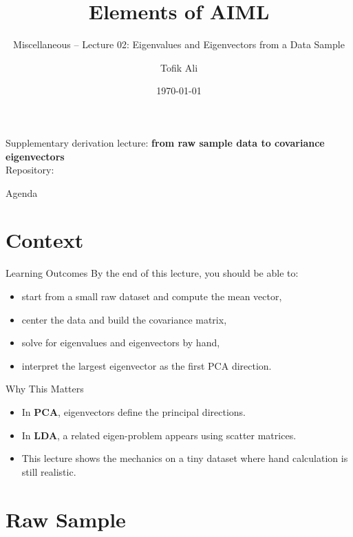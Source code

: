 \documentclass[aspectratio=169]{beamer}
\title[Elements of AIML]{Elements of AIML}
\subtitle{Miscellaneous -- Lecture 02: Eigenvalues and Eigenvectors from a Data Sample}
\author{Tofik Ali}
\institute{School of Computer Science, UPES Dehradun}
\date{\today}
\begin{document}
\UPESCoverFrame
\setcounter{framenumber}{0}

\begin{frame}
  \titlepage
  \vspace{0.3em}
  \begin{center}
    \footnotesize Supplementary derivation lecture: \textbf{from raw sample data to covariance eigenvectors}\\[0.25em]
    \footnotesize Repository: \texttt{\AIMLRepoURL}
  \end{center}
  \slidesources{\AIMLMiscSources}
\end{frame}

\begin{frame}{Agenda}
  \tableofcontents
\end{frame}

\section{Context}

\begin{frame}{Learning Outcomes}
  By the end of this lecture, you should be able to:
  \begin{itemize}[<+->]
    \item start from a small raw dataset and compute the mean vector,
    \item center the data and build the covariance matrix,
    \item solve for eigenvalues and eigenvectors by hand,
    \item interpret the largest eigenvector as the first PCA direction.
  \end{itemize}
\end{frame}

\begin{frame}{Why This Matters}
  \begin{itemize}[<+->]
    \item In \textbf{PCA}, eigenvectors define the principal directions.
    \item In \textbf{LDA}, a related eigen-problem appears using scatter matrices.
    \item This lecture shows the mechanics on a tiny dataset where hand calculation is still realistic.
  \end{itemize}
\end{frame}

\section{Raw Sample}
\end{document}
